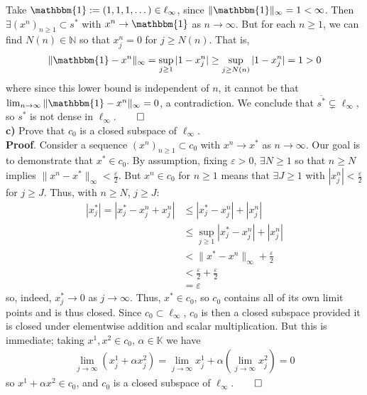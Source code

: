 \documentclass[10pt]{article}
\newcommand{\mbb}[1]{\mathbb{#1}}
\newcommand{\1}[1]{\mathbbm{1}_{#1}}
\begin{document}
    Take $\mathbbm{1}:=(1,1,1,\dots)\in\ell_\infty$, since $\|\mathbbm{1}\|_\infty=1<\infty$. Then $\exists(x^n)_{n\geq 1}\subset s^\ast$ with $x^n\rightarrow\mathbbm{1}$ as $n\rightarrow\infty$. But for each $n\geq 1$,
    we can find $N(n)\in\mbb{N}$ so that $x^n_j=0$ for $j\geq N(n)$. That is,
    \begin{align*}
        \|\mathbbm{1}-x^n\|_\infty=\sup_{j\geq 1}|1-x^n_j|\geq \sup_{j\geq N(n)}|1-x^n_j|=1>0
    \end{align*}
    where since this lower bound is independent of $n$, it cannot be that $\lim_{n\rightarrow\infty}\|\mathbbm{1}-x^n\|_\infty=0$, a contradiction. We conclude that $\overline{s^\ast}\subsetneq\ell_\infty$, so $s^\ast$ is not dense in $\ell_\infty$.\hfill{$\qed$}\\[5pt]
    {\bf c)} Prove that $c_0$ is a closed subspace of $\ell_\infty$.\\[5pt]
    {\bf Proof}. Consider a sequence $(x^n)_{n\geq1}\subset c_0$ with $x^n\rightarrow x^\ast$ as $n\rightarrow\infty$. Our goal is to demonstrate that
    $x^\ast\in c_0$. By assumption, fixing $\varepsilon>0$, $\exists N\geq 1$ so that $n\geq N$ implies $\|x^n-x^\ast\|_\infty<\tfrac{\varepsilon}{2}$. But $x^n\in c_0$ for $n\geq 1$
    means that $\exists J\geq 1$ with $|x^n_j|<\tfrac{\varepsilon}{2}$ for $j\geq J$. Thus, with $n\geq N$, $j\geq J$:
    \begin{align*}
        |x_j^\ast|=|x^\ast_j-x^n_j+x^n_j|&\leq |x^\ast_j-x^n_j|+|x^n_j|\\
        &\leq\sup_{j\geq 1}|x^\ast_j-x^n_j|+|x^n_j|\\
        &<\|x^\ast-x^n\|_{\infty}+\frac{\varepsilon}{2}\\
        &<\frac{\varepsilon}{2}+\frac{\varepsilon}{2}\\
        &=\varepsilon
    \end{align*}
    so, indeed, $x^\ast_j\rightarrow 0$ as $j\rightarrow\infty$. Thus, $x^\ast\in c_0$, so $c_0$ contains all of its own limit points and is thus closed. Since $c_0\subset\ell_\infty$, $c_0$ is then a closed
    subspace provided it is closed under elementwise addition and scalar multiplication. But this is immediate; taking $x^1,x^2\in c_0$, $\alpha\in\mbb{K}$ we have
    \begin{align*}
        \lim_{j\rightarrow\infty}(x^1_j+\alpha x^2_j)=\lim_{j\rightarrow\infty}x^1_j+\alpha(\lim_{j\rightarrow\infty}x^2_j)=0
    \end{align*}
    so $x^1+\alpha x^2\in c_0$, and $c_0$ is a closed subspace of $\ell_\infty$.\hfill{$\qed$}\\[5pt]
\end{document}
